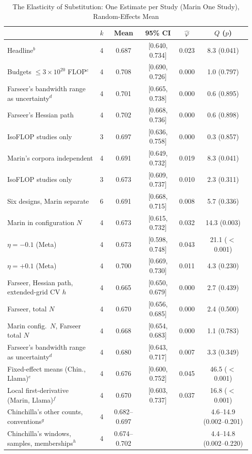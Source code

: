 \begin{table}[tp]
\centering
\caption{The Elasticity of Substitution: One Estimate per Study (Marin One Study), Random-Effects Mean}
\label{tab:app-sigma-study}
\footnotesize
\setlength{\tabcolsep}{2pt}
\begin{tabular*}{\textwidth}{@{\extracolsep{\fill}}>{\raggedright\arraybackslash}p{}ccccc@{}}
\toprule
 & $k$ & Mean & 95\% CI & $\hat\varphi$ & $Q$ ($p$) \\
\midrule
Headline$^{b}$ & 4 & 0.687 & [0.640, 0.734] & 0.023 & 8.3 (0.041) \\
Budgets $\le3\times10^{20}$ FLOP$^{c}$ & 4 & 0.708 & [0.690, 0.726] & 0.000 & 1.0 (0.797) \\
\quad Farseer's bandwidth range as uncertainty$^{d}$ & 4 & 0.701 & [0.665, 0.738] & 0.000 & 0.6 (0.895) \\
\quad Farseer's Hessian path & 4 & 0.702 & [0.668, 0.736] & 0.000 & 0.6 (0.898) \\
\quad IsoFLOP studies only & 3 & 0.697 & [0.636, 0.758] & 0.000 & 0.3 (0.857) \\
Marin's corpora independent & 4 & 0.691 & [0.649, 0.732] & 0.019 & 8.3 (0.041) \\
IsoFLOP studies only & 3 & 0.673 & [0.609, 0.737] & 0.010 & 2.3 (0.311) \\
Six designs, Marin separate & 6 & 0.691 & [0.668, 0.715] & 0.008 & 5.7 (0.336) \\
Marin in configuration $N$ & 4 & 0.673 & [0.615, 0.732] & 0.032 & 14.3 (0.003) \\
$\eta=-0.1$ (Meta) & 4 & 0.673 & [0.598, 0.748] & 0.043 & 21.1 ($<$0.001) \\
$\eta=+0.1$ (Meta) & 4 & 0.700 & [0.669, 0.730] & 0.011 & 4.3 (0.230) \\
Farseer, Hessian path, extended-grid CV $h$ & 4 & 0.665 & [0.650, 0.679] & 0.000 & 2.7 (0.439) \\
Farseer, total $N$ & 4 & 0.670 & [0.656, 0.685] & 0.000 & 2.4 (0.500) \\
Marin config.\ $N$, Farseer total $N$ & 4 & 0.668 & [0.654, 0.683] & 0.000 & 1.1 (0.783) \\
Farseer's bandwidth range as uncertainty$^{d}$ & 4 & 0.680 & [0.643, 0.717] & 0.007 & 3.3 (0.349) \\
Fixed-effect means (Chin., Llama)$^{e}$ & 4 & 0.676 & [0.600, 0.752] & 0.045 & 46.5 ($<$0.001) \\
Local first-derivative (Marin, Llama)$^{f}$ & 4 & 0.670 & [0.603, 0.737] & 0.037 & 16.8 ($<$0.001) \\
Chinchilla's other counts, conventions$^{g}$ & 4 & 0.682--0.697 & & & 4.6--14.9 (0.002--0.201) \\
Chinchilla's windows, samples, memberships$^{h}$ & 4 & 0.674--0.702 & & & 4.4--14.8 (0.002--0.220) \\
\bottomrule
\end{tabular*}


\end{table}
